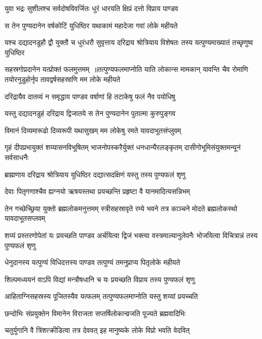 \twolineshloka
{युवा भद्रः सुशीलश्च सर्वदोषविवर्जितः}
{धुरं धारयति क्षिप्रं दत्तो विप्राय पाण्डव}


\twolineshloka
{स तेन पुण्यदानेन वर्षकोटिं युधिष्ठिर}
{यथाकामं महादेजा गवां लोके महीयते}


\threelineshloka
{यश्च दद्यादनडुहौ द्वौ युक्तौ च धुरंधरौ}
{सुवृत्ताय दरिद्राय श्रोत्रियाय विशेषतः}
{तस्य यत्पुण्यमाख्यातं तच्छृणुष्व युधिष्ठिर}


सहस्रगोप्रदानेन यत्प्रोक्तं फलमुत्तमम् ॥तत्पुण्यफलमाप्नोति याति लोकान्स मामकान्
\twolineshloka
{यावन्ति चैव रोमाणि तयोरनुडुहोर्नृप}
{तावद्वर्षसहस्राणि मम लोके महीयते}


\twolineshloka
{दरिद्रायैव दातव्यं न समृद्धाय पाण्डव}
{वर्षाणां हि तटाकेषु फलं नैव पयोधिषु}


\twolineshloka
{यस्तु दद्यादनडुहं दरिद्राय द्विजातये}
{स तेन पुण्यदानेन पुतात्मा कुरुपुङ्गव}


\twolineshloka
{विमानं दिव्यमारूढो दिव्यरूपी यथासुखम्}
{मम लोकेषु रमते यावदाभूतसंप्लुवम्}


\threelineshloka
{गृहं दीपप्रभायुक्तं शय्यासनविभूषितम्}
{भाजनोपस्करैर्युक्तं धनधान्यैरलङ्कृतम्}
{दासीगोभूमिसंयुक्तमन्यूनं सर्वसाधनैः}


\twolineshloka
{ब्राह्मणाय दरिद्राय श्रोत्रियाय युधिष्ठिर}
{दद्यात्सदक्षिणं यस्तु तस्य पुण्यफलं शृणु}


\twolineshloka
{देवाः पितृगणाश्चैव ह्यग्नयो ऋषयस्तथा}
{प्रयच्छन्ति प्रहृष्टा वै यानमादित्यसन्निभम्}


\threelineshloka
{तेन गच्छेच्छ्रिया युक्तो ब्रह्मलोकमनुत्तमम्}
{स्त्रीसहस्रावृते रम्ये भवने तत्र काञ्चने}
{मोदते ब्रह्मलोकस्थो यावदाभूतसप्लवम्}


\threelineshloka
{शय्यं प्रस्तरणोपेतां यः प्रयच्छति पाण्डव}
{अर्चयित्वा द्विजं भक्त्या वस्त्रमाल्यानुलेपनैः}
{भोजयित्वा विचित्रान्नं तस्य पुण्यफलं शृणु}


\twolineshloka
{धेनुदानस्य यत्पुण्यं विधिदत्तस्य पाण्डव}
{तत्पुण्यं तमनुप्राप्य पितृलोके महीयते}


\twolineshloka
{शिल्पमध्ययनं वाऽपि विद्यां मन्त्रौषधानि च}
{यः प्रयच्छति विप्राय तस्य पुण्यफलं शृणु}


\twolineshloka
{आहिताग्निसहस्रस्य पूजितस्यैव यत्फलम्}
{तत्पुण्यफलमाप्नोति यस्तु शय्यां प्रयच्चति}


\twolineshloka
{छन्दोभिः संप्रयुक्तेन विमानेन विराजता}
{सप्तर्षिलोकान्व्रजति पूज्यते ब्रह्मवादिभिः}


\twolineshloka
{चतुर्युगानि वै त्रिंशत्क्रीडित्वा तत्र देववत्}
{इह मानुष्यके लोके विप्रो भवति वेदवित्}


